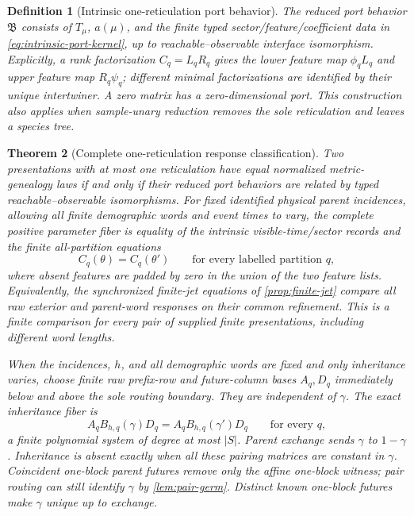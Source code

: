 \documentclass[11pt]{article}
\newtheorem{theorem}{Theorem}[section]
\newtheorem{definition}[theorem]{Definition}
\begin{document}
\begin{definition}[Intrinsic one-reticulation port behavior]
The \emph{reduced port behavior} $\mathfrak B$ consists of $T_\mu$, $a(\mu)$, and the finite typed sector/feature/coefficient data in \eqref{eq:intrinsic-port-kernel}, up to reachable--observable interface isomorphism.  Explicitly, a rank factorization $C_q=L_qR_q$ gives the lower feature map $\phi_qL_q$ and upper feature map $R_q\psi_q$; different minimal factorizations are identified by their unique intertwiner.  A zero matrix has a zero-dimensional port.  This construction also applies when sample-unary reduction removes the sole reticulation and leaves a species tree.
\end{definition}

\begin{theorem}[Complete one-reticulation response classification]
\label{thm:one-reticulation}
Two presentations with at most one reticulation have equal normalized metric-genealogy laws if and only if their reduced port behaviors are related by typed reachable--observable isomorphisms.  For fixed identified physical parent incidences, allowing all finite demographic words and event times to vary, the complete positive parameter fiber is equality of the intrinsic visible-time/sector records and the finite all-partition equations
\begin{equation}
C_q(\theta)=C_q(\theta')\qquad\text{for every labelled partition }q,
\label{eq:port-fiber}
\end{equation}
where absent features are padded by zero in the union of the two feature lists.  Equivalently, the synchronized finite-jet equations of \cref{prop:finite-jet} compare all raw exterior and parent-word responses on their common refinement.  This is a finite comparison for every pair of supplied finite presentations, including different word lengths.

When the incidences, $h$, and all demographic words are fixed and only inheritance varies, choose finite raw prefix-row and future-column bases $A_q,D_q$ immediately below and above the sole routing boundary.  They are independent of $\gamma$.  The exact inheritance fiber is
\begin{equation}
A_q B_{h,q}(\gamma)D_q=A_q B_{h,q}(\gamma')D_q\qquad\text{for every }q,
\label{eq:inheritance-port-fiber}
\end{equation}
a finite polynomial system of degree at most $|S|$.  Parent exchange sends $\gamma$ to $1-\gamma$.  Inheritance is absent exactly when all these pairing matrices are constant in $\gamma$.  Coincident one-block parent futures remove only the affine one-block witness; pair routing can still identify $\gamma$ by \cref{lem:pair-germ}.  Distinct known one-block futures make $\gamma$ unique up to exchange.
\end{theorem}
\end{document}
